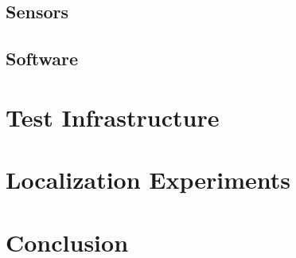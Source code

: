 \documentclass {udthesis}
\begin{document}
\subsection{Sensors}

\subsection{Software}

\section{Test Infrastructure}

\section{Localization Experiments}

\section{Conclusion}

\printglossary[type=\acronymtype]                  
\end{document}
